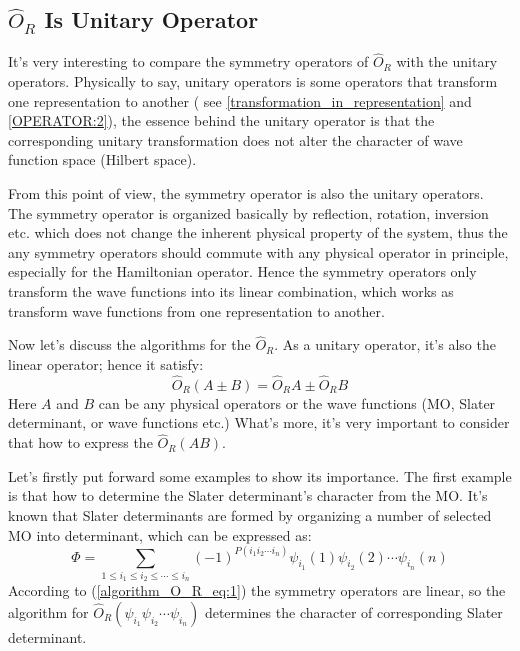 \subsection{$\hat{O}_{R}$ Is Unitary Operator}
%
%  
%
It's very interesting to compare the symmetry operators of  $\hat{O}_{R}$ with
the unitary operators. Physically to say, unitary operators is some
operators that transform one representation to another ( see
\ref{transformation_in_representation} and \ref{OPERATOR:2}), the essence
behind the unitary operator is that the corresponding unitary transformation
does not alter the character of wave function space (Hilbert space).

From this point of view, the symmetry operator is also the unitary operators.
The symmetry operator is organized basically by reflection, rotation, inversion
etc. which does not change the inherent physical property of the system, thus
the any symmetry operators should commute with any physical operator in
principle, especially for the Hamiltonian operator. Hence the symmetry
operators only transform the wave functions into its linear combination, which
works as transform wave functions from one representation to another.

Now let's discuss the algorithms for the $\hat{O}_{R}$. As a unitary operator,
it's also the linear operator; hence it satisfy:
\begin{equation}
 \hat{O}_{R} (A \pm B) =  \hat{O}_{R} A \pm \hat{O}_{R} B
\label{algorithm_O_R_eq:1}
\end{equation}
Here $A$ and $B$ can be any physical operators or the wave functions (MO,
Slater determinant, or wave functions etc.) What's more, it's very important to
consider that how to express the $\hat{O}_{R}(AB)$.

Let's firstly put forward some examples to show its importance. The first
example is that how to determine the Slater determinant's character from the
MO. It's known that Slater determinants are formed by organizing a number of
selected MO into determinant, which can be expressed as:
\begin{equation}
 \Phi = \sum_{1\leq i_{1} \leq i_{2} \leq \cdots \leq i_{n}}
(-1)^{P(i_{1}i_{2}\cdots
i_{n})}\psi_{i_{1}}(1)\psi_{i_{2}}(2)\cdots\psi_{i_{n}}(n)
\end{equation}
According to (\ref{algorithm_O_R_eq:1}) the symmetry operators are linear, so
the algorithm for $\hat{O}_{R}(\psi_{i_{1}}\psi_{i_{2}}\cdots\psi_{i_{n}})$
determines the character of corresponding Slater determinant.  

